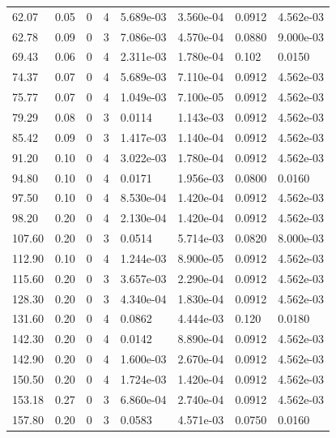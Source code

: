\documentclass[preview]{standalone}
\begin{document}
{{\begin{tabular}{L{1.2cm}C{1.2cm} C{0.3cm}C{0.5cm} C{1.4cm}C{1.4cm} C{1.4cm}C{1.4cm}}
  62.07  &  0.05  & 0     &  4 &  5.689e-03  & 3.560e-04  & 0.0912 &  4.562e-03   \\ 
  62.78  &  0.09  & 0     &  3 &  7.086e-03  & 4.570e-04  & 0.0880 &  9.000e-03   \\ 
  69.43  &  0.06  & 0     &  4 &  2.311e-03  & 1.780e-04  & 0.102 &  0.0150   \\ 
  74.37  &  0.07  & 0     &  4 &  5.689e-03  & 7.110e-04  & 0.0912 &  4.562e-03   \\ 
  75.77  &  0.07  & 0     &  4 &  1.049e-03  & 7.100e-05  & 0.0912 &  4.562e-03   \\ 
  79.29  &  0.08  & 0     &  3 &  0.0114  & 1.143e-03  & 0.0912 &  4.562e-03   \\ 
  85.42  &  0.09  & 0     &  3 &  1.417e-03  & 1.140e-04  & 0.0912 &  4.562e-03   \\ 
  91.20  &  0.10  & 0     &  4 &  3.022e-03  & 1.780e-04  & 0.0912 &  4.562e-03   \\ 
  94.80  &  0.10  & 0     &  4 &  0.0171  & 1.956e-03  & 0.0800 &  0.0160   \\ 
  97.50  &  0.10  & 0     &  4 &  8.530e-04  & 1.420e-04  & 0.0912 &  4.562e-03   \\ 
  98.20  &  0.20  & 0     &  4 &  2.130e-04  & 1.420e-04  & 0.0912 &  4.562e-03   \\ 
  107.60  &  0.20  & 0     &  3 &  0.0514  & 5.714e-03  & 0.0820 &  8.000e-03   \\ 
  112.90  &  0.10  & 0     &  4 &  1.244e-03  & 8.900e-05  & 0.0912 &  4.562e-03   \\ 
  115.60  &  0.20  & 0     &  3 &  3.657e-03  & 2.290e-04  & 0.0912 &  4.562e-03   \\ 
  128.30  &  0.20  & 0     &  3 &  4.340e-04  & 1.830e-04  & 0.0912 &  4.562e-03   \\ 
  131.60  &  0.20  & 0     &  4 &  0.0862  & 4.444e-03  & 0.120 &  0.0180   \\ 
  142.30  &  0.20  & 0     &  4 &  0.0142  & 8.890e-04  & 0.0912 &  4.562e-03   \\ 
  142.90  &  0.20  & 0     &  4 &  1.600e-03  & 2.670e-04  & 0.0912 &  4.562e-03   \\ 
  150.50  &  0.20  & 0     &  4 &  1.724e-03  & 1.420e-04  & 0.0912 &  4.562e-03   \\ 
  153.18  &  0.27  & 0     &  3 &  6.860e-04  & 2.740e-04  & 0.0912 &  4.562e-03   \\ 
  157.80  &  0.20  & 0     &  3 &  0.0583  & 4.571e-03  & 0.0750 &  0.0160   \\ 

\end{tabular}}}
\end{document}
